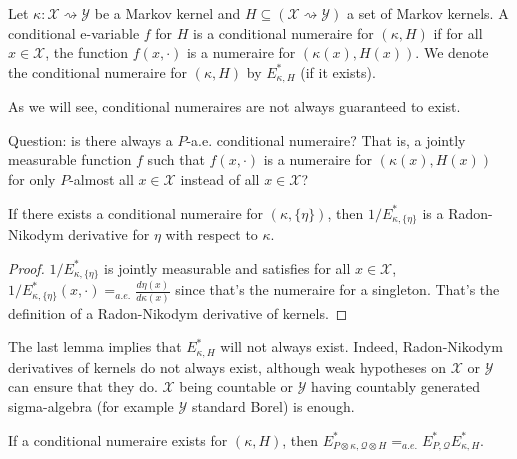 \begin{definition}\label{def:condNumeraire}
Let $\kappa : \mathcal{X} \rightsquigarrow \mathcal{Y}$ be a Markov kernel and $H \subseteq (\mathcal{X} \rightsquigarrow \mathcal{Y})$ a set of Markov kernels.
A conditional e-variable $f$ for $H$ is a conditional numeraire for $(\kappa, H)$ if for all $x \in \mathcal{X}$, the function $f(x, \cdot)$ is a numeraire for $(\kappa(x), H(x))$.
We denote the conditional numeraire for $(\kappa, H)$ by $E^*_{\kappa, H}$ (if it exists).
\end{definition}


As we will see, conditional numeraires are not always guaranteed to exist.

Question: is there always a $P$-a.e. conditional numeraire? That is, a jointly measurable function $f$ such that $f(x, \cdot)$ is a numeraire for $(\kappa(x), H(x))$ for only $P$-almost all $x \in \mathcal{X}$ instead of all $x \in \mathcal{X}$?


\begin{lemma}\label{lem:condNumeraire_singleton}
If there exists a conditional numeraire for $(\kappa, \{\eta\})$, then $1/E^*_{\kappa, \{\eta\}}$ is a Radon-Nikodym derivative for $\eta$ with respect to $\kappa$.
\end{lemma}

\begin{proof}
$1/E^*_{\kappa, \{\eta\}}$ is jointly measurable and satisfies for all $x \in \mathcal{X}$, $1/E^*_{\kappa, \{\eta\}}(x, \cdot) =_{a.e.} \frac{d\eta(x)}{d \kappa(x)}$ since that's the numeraire for a singleton.
That's the definition of a Radon-Nikodym derivative of kernels.
\end{proof}

The last lemma implies that $E^*_{\kappa, H}$ will not always exist.
Indeed, Radon-Nikodym derivatives of kernels do not always exist, although weak hypotheses on $\mathcal{X}$ or $\mathcal{Y}$ can ensure that they do.
$\mathcal{X}$ being countable or $\mathcal{Y}$ having countably generated sigma-algebra (for example $\mathcal{Y}$ standard Borel) is enough.

\begin{theorem}\label{thm:numeraire_compProd_of_condNumeraire}
If a conditional numeraire exists for $(\kappa, H)$, then
$E^*_{P \otimes \kappa, \mathcal{Q} \otimes H} =_{a.e.} E^*_{P, \mathcal{Q}}E^*_{\kappa, H}$.
\end{theorem}

